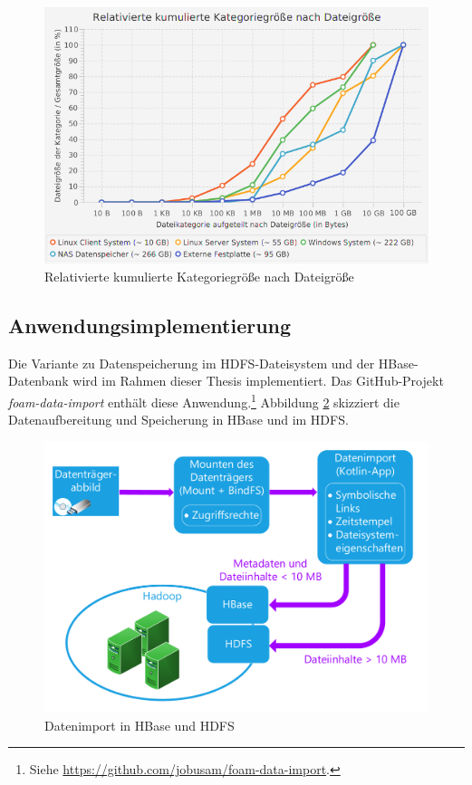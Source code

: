  \begin{figure}[ht]
  \centering
  \includegraphics[width=\textwidth]{./resource/fileSize_relativeCumulatedCategorieSize.png}
  \caption{Relativierte kumulierte Kategoriegröße nach Dateigröße}
  \label{fig:file_size_r_c_file_size}
\end{figure}

\subsection{Anwendungsimplementierung} 
\label{subsec:data_import_implementation}

Die Variante zu Datenspeicherung im HDFS-Dateisystem und der HBase-Datenbank wird im Rahmen dieser Thesis implementiert. Das GitHub-Projekt \textit{foam-data-import} enthält diese Anwendung.\footnote{Siehe \url{https://github.com/jobusam/foam-data-import}.} Abbildung \ref{fig:data_import} skizziert die Datenaufbereitung und Speicherung in HBase und im HDFS.\\
\begin{figure}[ht]
  \centering
  \includegraphics[width=\textwidth]{./resource/storage_hdfs_and_hbase.pdf}
  \caption{Datenimport in HBase und HDFS}
  \label{fig:data_import}
\end{figure}

